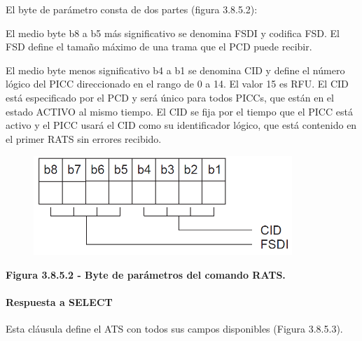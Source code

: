 El byte de parámetro consta de dos partes (figura 3.8.5.2):\par

El medio byte b8 a b5 más significativo se denomina FSDI y codifica FSD. El FSD define el tamaño máximo de una trama que el PCD puede recibir.\par

El medio byte menos significativo b4 a b1 se denomina CID y define el número lógico del PICC direccionado en el rango de 0 a 14. El valor 15 es RFU. El CID está especificado por el PCD y será único para todos PICCs, que están en el estado ACTIVO al mismo tiempo. El CID se fija por el tiempo que el PICC está activo y el PICC usará el CID como su identificador lógico, que está contenido en el primer RATS sin errores recibido.\par


\vspace{\baselineskip}



\begin{figure}[H]
	\begin{center}
		\includegraphics[width=3.84in,height=1.48in]{Norma_ISO/14443-4/media/image5.png}
    \end{center}
\end{figure}



\par
\begin{center}
\textbf{Figura 3.8.5.2 - Byte de parámetros del comando RATS.}
\end{center}
\par

\paragraph{Respuesta a SELECT}
Esta cláusula define el ATS con todos sus campos disponibles (Figura 3.8.5.3).\par


